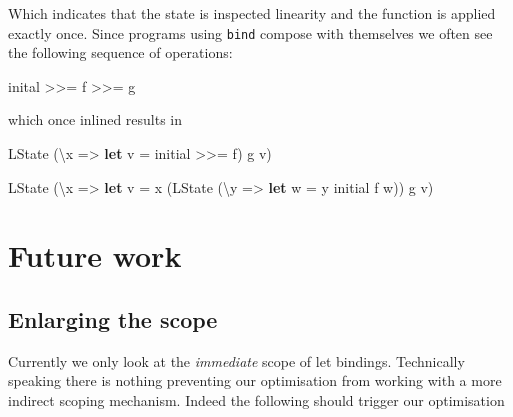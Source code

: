 \documentclass[
]{article}
\newenvironment{Shaded}{}{}
\newcommand{\DataTypeTok}[1]{\textcolor[rgb]{0.56,0.13,0.00}{#1}}
\newcommand{\KeywordTok}[1]{\textcolor[rgb]{0.00,0.44,0.13}{\textbf{#1}}}
\newcommand{\NormalTok}[1]{#1}
\newcommand{\OperatorTok}[1]{\textcolor[rgb]{0.40,0.40,0.40}{#1}}
\newcommand{\OtherTok}[1]{\textcolor[rgb]{0.00,0.44,0.13}{#1}}
\begin{document}
Which indicates that the state is inspected linearity and the function
is applied exactly once. Since programs using \texttt{bind} compose with
themselves we often see the following sequence of operations:

\begin{Shaded}
\begin{Highlighting}[]
\NormalTok{inital }\OperatorTok{\textgreater{}\textgreater{}=}\NormalTok{ f }\OperatorTok{\textgreater{}\textgreater{}=}\NormalTok{ g}
\end{Highlighting}
\end{Shaded}

which once inlined results in

\begin{Shaded}
\begin{Highlighting}[]
\DataTypeTok{LState}\NormalTok{ (\textbackslash{}x }\OtherTok{=\textgreater{}} \KeywordTok{let}\NormalTok{ v }\OtherTok{=}\NormalTok{ initial }\OperatorTok{\textgreater{}\textgreater{}=}\NormalTok{ f)}
\NormalTok{                  g v)}
\end{Highlighting}
\end{Shaded}

\begin{Shaded}
\begin{Highlighting}[]
\DataTypeTok{LState}\NormalTok{ (\textbackslash{}x }\OtherTok{=\textgreater{}} \KeywordTok{let}\NormalTok{ v }\OtherTok{=}\NormalTok{ x (}\DataTypeTok{LState}\NormalTok{ (\textbackslash{}y }\OtherTok{=\textgreater{}} \KeywordTok{let}\NormalTok{ w }\OtherTok{=}\NormalTok{ y initial }
\NormalTok{                                           f w))}
\NormalTok{                  g v)}
\end{Highlighting}
\end{Shaded}

\hypertarget{future-work}{%
\section{Future work}\label{future-work}}

\hypertarget{enlarging-the-scope}{%
\subsection{Enlarging the scope}\label{enlarging-the-scope}}

Currently we only look at the \emph{immediate} scope of let bindings.
Technically speaking there is nothing preventing our optimisation from
working with a more indirect scoping mechanism. Indeed the following
should trigger our optimisation
\end{document}
